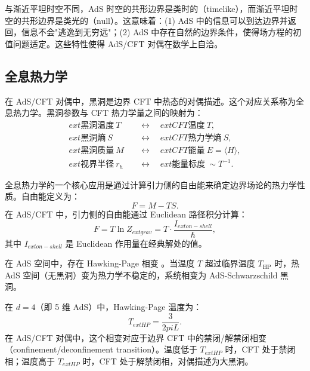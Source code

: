 \begin{remark}
与渐近平坦时空不同，AdS 时空的共形边界是类时的（timelike），而渐近平坦时空的共形边界是类光的（null）。这意味着：(1) AdS 中的信息可以到达边界并返回，信息不会"逃逸到无穷远"；(2) AdS 中存在自然的边界条件，使得场方程的初值问题适定。这些特性使得 AdS/CFT 对偶在数学上自洽。
\end{remark}

\subsection{全息热力学}

\begin{definition}[全息热力学]\label{def:holographic-thermo}
在 AdS/CFT 对偶中，黑洞是边界 CFT 中热态的对偶描述。这个对应关系称为全息热力学。黑洞参数与 CFT 热力学量之间的映射为：
\begin{equation}\label{eq:holographic-map}
\boxed{
    \begin{aligned}
        ext{黑洞温度}\ T &\quad\longleftrightarrow\quad ext{CFT 温度}\ T, \\
        ext{黑洞熵}\ S &\quad\longleftrightarrow\quad ext{CFT 热力学熵}\ S, \\
        ext{黑洞质量}\ M &\quad\longleftrightarrow\quad ext{CFT 能量}\ E = \langle H \rangle, \\
        ext{视界半径}\ r_h &\quad\longleftrightarrow\quad ext{能量标度}\ \sim T^{-1}.
    \end{aligned}
}
\end{equation}
\end{definition}

\begin{property}[自由能与相变]\label{prop:free-energy}
全息热力学的一个核心应用是通过计算引力侧的自由能来确定边界场论的热力学性质。自由能定义为：
\begin{equation}\label{eq:free-energy}
    F = M - TS.
\end{equation}
在 AdS/CFT 中，引力侧的自由能通过 Euclidean 路径积分计算：
\begin{equation}
    F = T \ln Z_{ext{grav}} = T \cdot \frac{I_{ext{on-shell}}}{\hbar},
\end{equation}
其中 $I_{ext{on-shell}}$ 是 Euclidean 作用量在经典解处的值。
\end{property}

\begin{example}\label{ex:Hawking-Page}
在 AdS 空间中，存在 Hawking-Page 相变 \cite{Hawking1975}。当温度 $T$ 超过临界温度 $T_{\text{HP}}$ 时，热 AdS 空间（无黑洞）变为热力学不稳定的，系统相变为 AdS-Schwarzschild 黑洞。

在 $d=4$（即 5 维 AdS）中，Hawking-Page 温度为：
\begin{equation}
    T_{ext{HP}} = \frac{3}{2pi L}.
\end{equation}
在 AdS/CFT 对偶中，这个相变对应于边界 CFT 中的禁闭/解禁闭相变（confinement/deconfinement transition）。温度低于 $T_{ext{HP}}$ 时，CFT 处于禁闭相；温度高于 $T_{ext{HP}}$ 时，CFT 处于解禁闭相，对偶描述为大黑洞。
\end{example}

